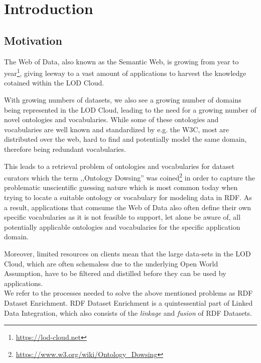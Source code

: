 \chapter{Introduction}
\label{ch:intro}
\section{Motivation}
\label{sec:motivation}
The Web of Data, also known as the Semantic Web, is growing from year to year\footnote{\url{https://lod-cloud.net}},
  giving leeway to a vast amount of applications to harvest the knowledge cotained within the \ac{LOD} Cloud.
  
With growing numbers of datasets, we also see a growing number of domains being represented in the \ac{LOD} Cloud, leading to the need for a growing number of novel ontologies and vocabularies.
While some of these ontologies and vocabularies are well known and standardized by e.g. the \ac{W3C}, most are distributed over the web, hard to find and potentially model the same domain, therefore being redundant vocabularies.

This leads to a retrieval problem of ontologies and vocabularies for dataset curators which the term ,,Ontology Dowsing'' was coined\footnote{\url{https://www.w3.org/wiki/Ontology_Dowsing}} in order to capture the problematic unscientific guessing nature which is most common today when trying to locate a suitable ontology or vocabulary for modeling data in RDF.
As a result, applications that comsume the Web of Data also often define their own specific vocabularies as it is not feasible to support, let alone be aware of, all potentially applicable ontologies and vocabularies for the specific application domain.

Moreover, limited resources on clients mean that the large data-sets in the \ac{LOD} Cloud, which are often schemaless due to the underlying Open World Assumption, have to be filtered and distilled before they can be used by applications.\\

We refer to the processes needed to solve the above mentioned problems as RDF Dataset Enrichment.
RDF Dataset Enrichment is a quintessential part of Linked Data Integration, which also consists of the \emph{linkage} and \emph{fusion} of RDF Datasets.

